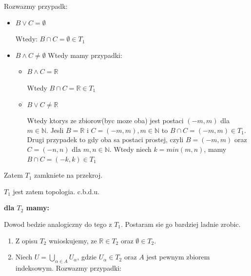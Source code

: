 \documentclass{article}
\begin{document}
\begin{enumerate}
\begin{enumerate}[label=(\alph*')]
                Rozwazmy przypadk:
                \begin{itemize}

                    \item $B \lor C = \emptyset$

                        Wtedy: $B \cap C = \emptyset \in T_{1}$
                    \item $B \land C \neq \emptyset$ Wtedy mamy przypadki:

                        \begin{itemize}

                            \item $B \land C = \mathbb{R}$ 

                                Wtedy $B \cap C = \mathbb{R} \in T_{1}$

                            \item $B \lor C \neq \mathbb{R}$ 

                                Wtedy ktorys ze zbiorow(byc moze oba) jest postaci $(-m,m)$ dla $m \in \mathbb{N}$. Jesli $B = \mathbb{R}$ i $C = (-m,m), m\in \mathbb{N}$ to $B \cap C = (-m,m) \in T_{1}$.
                                Drugi przypadek to gdy oba sa postaci prostej, czyli $B = (-m,m)$ oraz $C = (-n,n)$ dla $m,n \in \mathbb{N}$. Wtedy niech $k = min(m,n)$, mamy $B \cap C = (-k,k) \in T_{1}$

                        \end{itemize}
                \end{itemize}
                Zatem $T_{1}$ zamkniete na przekroj.    
        \end{enumerate}
        $T_{1}$ jest zatem topologia. c.b.d.u.

        \textbf{dla $T_{2}$ mamy:} 

        Dowod bedzie analogiczny do tego z $T_{1}$. Postaram sie go bardziej ladnie zrobic.

        \begin{enumerate}[label=(\alph*')]%

            \item Z opisu $T_{2}$ wnioskujemy, ze $\mathbb{R} \in T_{2}$ oraz $\emptyset \in T_{2}$.
            \item Niech $U = \bigcup\limits_{\alpha \in A}U_{\alpha}$, gdzie $U_{\alpha} \in T_{2}$ oraz $A$ jest pewnym zbiorem indeksowym. Rozwazmy przypadki:

                \begin{itemize}%


\end{itemize}
\end{enumerate}
\end{enumerate}
\end{document}
